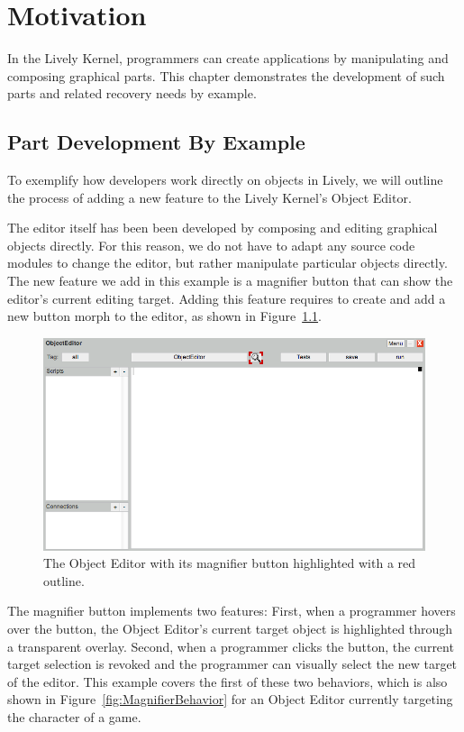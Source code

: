 \chapter{Motivation} \label{chapter:MOTIVATION}

In the Lively Kernel, programmers can create applications by manipulating and composing graphical parts.
This chapter demonstrates the development of such parts and related recovery needs by example.


\section{Part Development By Example}

To exemplify how developers work directly on objects in Lively, we will outline the process of adding a new feature to the Lively Kernel's Object Editor.

The editor itself has been been developed by composing and editing graphical objects directly.
For this reason, we do not have to adapt any source code modules to change the editor, but rather manipulate particular objects directly.
The new feature we add in this example is a magnifier button that can show the editor's current editing target.
Adding this feature requires to create and add a new button morph to the editor, as shown in Figure~\ref{fig:MagnifierButton}.

\begin{figure}[h]
    \centering
    \includegraphics[width=\textwidth]{figures/3_motivation/1_magnifierButton.png}
    \caption{The Object Editor with its magnifier button highlighted with a red outline.}
    \label{fig:MagnifierButton}
\end{figure}

The magnifier button implements two features: First, when a programmer hovers over the button, the Object Editor's current target object is highlighted through a transparent overlay. Second, when a programmer clicks the button, the current target selection is revoked and the programmer can visually select the new target of the editor.
This example covers the first of these two behaviors, which is also shown in Figure~\ref{fig:MagnifierBehavior} for an Object Editor currently targeting the character of a game.

